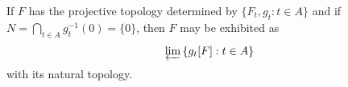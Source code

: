If $F$ has the projective topology determined by $\{F_t, g_t : t \in A\}$ and if $N = \bigcap_{t \in A} g_t^{-1}(0) = \{0\}$, then $F$ may be exhibited as
$$\varprojlim \, \{g_t[F] : t \in A\}$$
with its natural topology.
